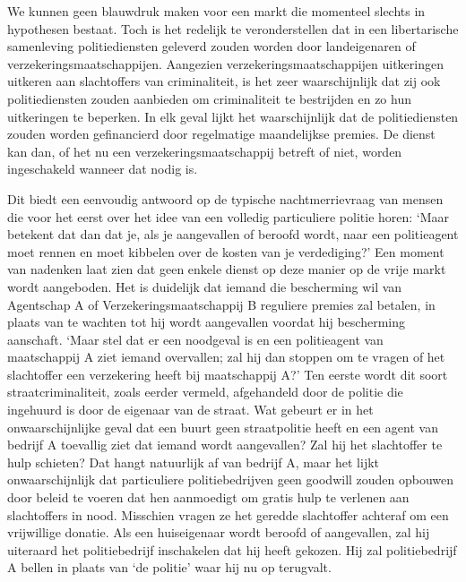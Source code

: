 \documentclass[
  a5paper,
  smalldemyvopaper,10pt,twoside,onecolumn,openright,extrafontsizes,hidelinks]{memoir}
\begin{document}
We kunnen geen blauwdruk maken voor een markt die momenteel slechts in
hypothesen bestaat. Toch is het redelijk te veronderstellen dat in een
libertarische samenleving politiediensten geleverd zouden worden door
landeigenaren of verzekeringsmaatschappijen. Aangezien
verzekeringsmaatschappijen uitkeringen uitkeren aan slachtoffers van
criminaliteit, is het zeer waarschijnlijk dat zij ook politiediensten
zouden aanbieden om criminaliteit te bestrijden en zo hun uitkeringen te
beperken. In elk geval lijkt het waarschijnlijk dat de politiediensten
zouden worden gefinancierd door regelmatige maandelijkse premies. De
dienst kan dan, of het nu een verzekeringsmaatschappij betreft of niet,
worden ingeschakeld wanneer dat nodig is.

Dit biedt een eenvoudig antwoord op de typische nachtmerrievraag van
mensen die voor het eerst over het idee van een volledig particuliere
politie horen: `Maar betekent dat dan dat je, als je aangevallen of
beroofd wordt, naar een politieagent moet rennen en moet kibbelen over
de kosten van je verdediging?' Een moment van nadenken laat zien dat
geen enkele dienst op deze manier op de vrije markt wordt aangeboden.
Het is duidelijk dat iemand die bescherming wil van Agentschap A of
Verzekeringsmaatschappij B reguliere premies zal betalen, in plaats van
te wachten tot hij wordt aangevallen voordat hij bescherming aanschaft.
`Maar stel dat er een noodgeval is en een politieagent van maatschappij
A ziet iemand overvallen; zal hij dan stoppen om te vragen of het
slachtoffer een verzekering heeft bij maatschappij A?' Ten eerste wordt
dit soort straatcriminaliteit, zoals eerder vermeld, afgehandeld door de
politie die ingehuurd is door de eigenaar van de straat. Wat gebeurt er
in het onwaarschijnlijke geval dat een buurt geen straatpolitie heeft en
een agent van bedrijf A toevallig ziet dat iemand wordt aangevallen? Zal
hij het slachtoffer te hulp schieten? Dat hangt natuurlijk af van
bedrijf A, maar het lijkt onwaarschijnlijk dat particuliere
politiebedrijven geen goodwill zouden opbouwen door beleid te voeren dat
hen aanmoedigt om gratis hulp te verlenen aan slachtoffers in nood.
Misschien vragen ze het geredde slachtoffer achteraf om een vrijwillige
donatie. Als een huiseigenaar wordt beroofd of aangevallen, zal hij
uiteraard het politiebedrijf inschakelen dat hij heeft gekozen. Hij zal
politiebedrijf A bellen in plaats van `de politie' waar hij nu op
terugvalt.
\end{document}
